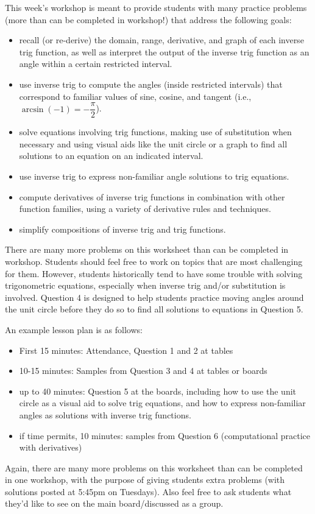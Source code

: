 \documentclass{article}
\begin{document}
\begin{workshop}
   This week's workshop is meant to provide students with many practice problems (more than can be completed in workshop!) that address the following goals:
    \begin{itemize}
        \item recall (or re-derive) the domain, range, derivative, and graph of each inverse trig function, as well as interpret the output of the inverse trig function as an angle within a certain restricted interval.
        \item use inverse trig to compute the angles (inside restricted intervals) that correspond to familiar values of sine, cosine, and tangent (i.e., $\arcsin (-1)=-\dfrac{\pi}{2}$). 
        \item solve equations involving trig functions, making use of substitution when necessary and using visual aids like the unit circle or a graph to find all solutions to an equation on an indicated interval.
        \item use inverse trig to express non-familiar angle solutions to trig equations.
        \item compute derivatives of inverse trig functions in combination with other function families, using a variety of derivative rules and techniques.
        \item simplify compositions of inverse trig and trig functions.
    \end{itemize}
   There are many more problems on this worksheet than can be completed in workshop. Students should feel free to work on topics that are most challenging for them. However, students historically tend to have some trouble with solving trigonometric equations, especially when inverse trig and/or substitution is involved. Question 4 is designed to help students practice moving angles around the unit circle before they do so to find all solutions to equations in Question 5.

   An example lesson plan is as follows:
   \begin{itemize}
       \item First 15 minutes: Attendance, Question 1 and 2 at tables
       \item 10-15 minutes: Samples from Question 3 and 4 at tables or boards
       \item up to 40 minutes: Question 5 at the boards, including how to use the unit circle as a visual aid to solve trig equations, and how to express non-familiar angles as solutions with inverse trig functions.
       \item if time permits, 10 minutes: samples from Question 6 (computational practice with derivatives)
   \end{itemize}
Again, there are many more problems on this worksheet than can be completed in one workshop, with the purpose of giving students extra problems (with solutions posted at 5:45pm on Tuesdays). Also feel free to ask students what they'd like to see on the main board/discussed as a group.
\end{workshop}
\end{document}
